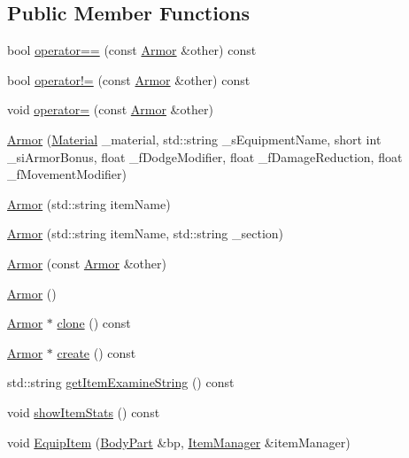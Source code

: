 \subsection*{Public Member Functions}
\begin{DoxyCompactItemize}
\item 
bool \mbox{\hyperlink{class_armor_a400f558650400d25fc5fc3031a455c46}{operator==}} (const \mbox{\hyperlink{class_armor}{Armor}} \&other) const
\item 
bool \mbox{\hyperlink{class_armor_a912e1ad6bfe7509c66c2c4966cf5188c}{operator!=}} (const \mbox{\hyperlink{class_armor}{Armor}} \&other) const
\item 
void \mbox{\hyperlink{class_armor_ad706d994c7d3a3ea4d7c1728faccc0aa}{operator=}} (const \mbox{\hyperlink{class_armor}{Armor}} \&other)
\item 
\mbox{\hyperlink{class_armor_a4a33d37eb11165792cce7035dfb2ff93}{Armor}} (\mbox{\hyperlink{class_material}{Material}} \+\_\+material, std\+::string \+\_\+s\+Equipment\+Name, short int \+\_\+si\+Armor\+Bonus, float \+\_\+f\+Dodge\+Modifier, float \+\_\+f\+Damage\+Reduction, float \+\_\+f\+Movement\+Modifier)
\item 
\mbox{\hyperlink{class_armor_a6e58e27c6b7550a8baf7fb1b2167d6cc}{Armor}} (std\+::string item\+Name)
\item 
\mbox{\hyperlink{class_armor_a1a1bc35d82ebba3f5a81f9e40d93f3c9}{Armor}} (std\+::string item\+Name, std\+::string \+\_\+section)
\item 
\mbox{\hyperlink{class_armor_a40d54a621183a93edaecb2cd4e83c800}{Armor}} (const \mbox{\hyperlink{class_armor}{Armor}} \&other)
\item 
\mbox{\hyperlink{class_armor_a23323e95bbeb488eb6fe54cbd83d49a2}{Armor}} ()
\item 
\mbox{\hyperlink{class_armor}{Armor}} $\ast$ \mbox{\hyperlink{class_armor_aac8aec108de9a8a45bada1534c0f23b7}{clone}} () const
\item 
\mbox{\hyperlink{class_armor}{Armor}} $\ast$ \mbox{\hyperlink{class_armor_a21de0acaa6ecdb6f5937166b83da9b01}{create}} () const
\item 
std\+::string \mbox{\hyperlink{class_armor_a731bb4d1fe53070f30a336db82fada2c}{get\+Item\+Examine\+String}} () const
\item 
void \mbox{\hyperlink{class_armor_a4fe1507d7aaf280a18e19f51a6f8c42d}{show\+Item\+Stats}} () const
\item 
void \mbox{\hyperlink{class_armor_a0b5dc1feb7b5d3c4bd023cf9e0857fe3}{Equip\+Item}} (\mbox{\hyperlink{class_body_part}{Body\+Part}} \&bp, \mbox{\hyperlink{class_item_manager}{Item\+Manager}} \&item\+Manager)

\end{DoxyCompactItemize}
